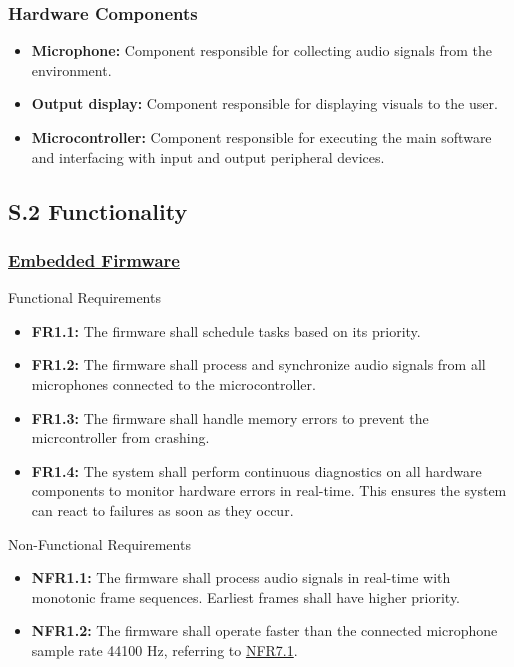 \documentclass[12pt]{article}
\theoremstyle{definition}
\begin{document}
\subsubsection{Hardware Components}

\begin{itemize}
  \item \textbf{Microphone:}\label{comp:microphone} Component responsible for
  collecting audio signals from the environment.

  \item \textbf{Output display:}\label{comp:display} Component responsible for
  displaying visuals to the user.

  \item \textbf{Microcontroller:} \label{comp:microcontroller} Component
  responsible for executing the main software and interfacing with input and
  output peripheral devices.
\end{itemize}

\subsection{S.2 Functionality}

\subsubsection{\hyperref[comp:embedded_firmware]{Embedded Firmware}} Functional
Requirements
\begin{itemize}
  \item \label{FR1_1}\textbf{FR1.1:} The firmware shall schedule tasks based on
  its priority.
  
  \item \label{FR1_2}\textbf{FR1.2:} The firmware shall process and synchronize
  audio signals from all microphones connected to the microcontroller.

  \item \label{FR1_3}\textbf{FR1.3:} The firmware shall handle memory errors to
  prevent the micrcontroller from crashing.

  \item \label{FR1_4}\textbf{FR1.4:} The system shall perform continuous
  diagnostics on all hardware components to monitor hardware errors in
  real-time. This ensures the system can react to failures as soon as they
  occur.
\end{itemize}

Non-Functional Requirements
\begin{itemize}
  \item \label{NFR1_1}\textbf{NFR1.1:} The firmware shall process audio signals
  in real-time with monotonic frame sequences. Earliest frames shall have higher
  priority.
  
  \item \label{NFR1_2}\textbf{NFR1.2:} The firmware shall operate faster than
  the connected microphone sample rate 44100 Hz, referring to
  \hyperref[NFR7_1]{NFR7.1}.
\end{itemize}
\end{document}

